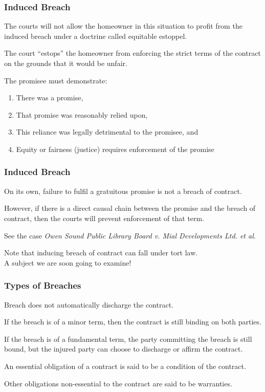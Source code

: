 \begin{frame}
\frametitle{Induced Breach}

The courts will not allow the homeowner in this situation to profit from the induced breach under a doctrine called \alert{equitable estoppel}.

The court ``estops'' the homeowner from enforcing the strict terms of the contract on the grounds that it would be unfair.

The promisee must demonstrate:

\begin{enumerate}
\item There was a promise,
\item That promise was reasonably relied upon,
\item This reliance was legally detrimental to the promisee, and
\item Equity or fairness (justice) requires enforcement of the promise
\end{enumerate}

\end{frame}



\begin{frame}
\frametitle{Induced Breach}

On its own, failure to fulfil a gratuitous promise is not a breach of contract.

However, if there is a direct causal chain between the promise and the breach of contract, then the courts will prevent enforcement of that term.

See the case \textit{Owen Sound Public Library Board v. Mial Developments Ltd. et al}.

Note that inducing breach of contract can fall under tort law.\\
\quad A subject we are soon going to examine!

\end{frame}


\begin{frame}
\frametitle{Types of Breaches}

Breach does not automatically discharge the contract.

If the breach is of a minor term, then the contract is still binding on both parties.

If the breach is of a fundamental term, the party committing the breach is still bound, but the injured party can choose to discharge or affirm the contract.

An essential obligation of a contract is said to be a \alert{condition} of the contract.

Other obligations non-essential to the contract are said to be \alert{warranties}.

\end{frame}




